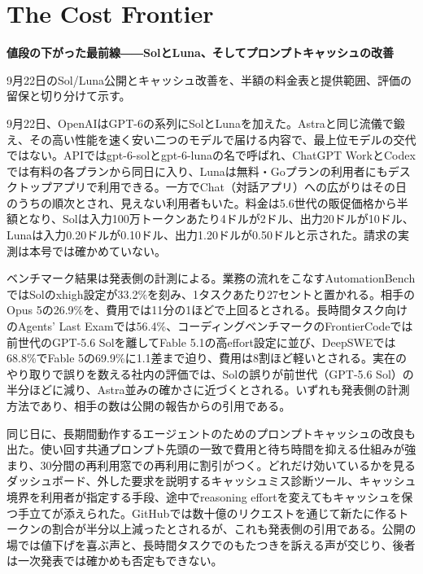 \section{The Cost Frontier}
\begin{wideflow}
{\Large\bfseries 値段の下がった最前線――SolとLuna、そしてプロンプトキャッシュの改善}\par
\smallskip
{\color{SurveyMuted}9月22日のSol/Luna公開とキャッシュ改善を、半額の料金表と提供範囲、評価の留保と切り分けて示す。}\par
\end{wideflow}

9月22日、OpenAIはGPT-6の系列にSolとLunaを加えた\cite{gpt6solluna}。Astraと同じ流儀で鍛え、その高い性能を速く安い二つのモデルで届ける内容で、最上位モデルの交代ではない。APIではgpt-6-solとgpt-6-lunaの名で呼ばれ、ChatGPT WorkとCodexでは有料の各プランから同日に入り、Lunaは無料・Goプランの利用者にもデスクトップアプリで利用できる。一方でChat（対話アプリ）への広がりはその日のうちの順次とされ、見えない利用者もいた。料金は5.6世代の販促価格から半額となり、Solは入力100万トークンあたり4ドルが2ドル、出力20ドルが10ドル、Lunaは入力0.20ドルが0.10ドル、出力1.20ドルが0.50ドルと示された。請求の実測は本号では確かめていない。

ベンチマーク結果は発表側の計測による。業務の流れをこなすAutomationBenchではSolのxhigh設定が33.2\%を刻み、1タスクあたり27セントと置かれる。相手のOpus 5の26.9\%を、費用では11分の1ほどで上回るとされる。長時間タスク向けのAgents' Last Examでは56.4\%、コーディングベンチマークのFrontierCodeでは前世代のGPT-5.6 Solを離してFable 5.1の高effort設定に並び、DeepSWEでは68.8\%でFable 5の69.9\%に1.1差まで迫り、費用は8割ほど軽いとされる。実在のやり取りで誤りを数える社内の評価では、Solの誤りが前世代（GPT-5.6 Sol）の半分ほどに減り、Astra並みの確かさに近づくとされる。いずれも発表側の計測方法であり、相手の数は公開の報告からの引用である。

同じ日に、長期間動作するエージェントのためのプロンプトキャッシュの改良も出た\cite{gpt6caching}。使い回す共通プロンプト先頭の一致で費用と待ち時間を抑える仕組みが強まり、30分間の再利用窓での再利用に割引がつく。どれだけ効いているかを見るダッシュボード、外した要求を説明するキャッシュミス診断ツール、キャッシュ境界を利用者が指定する手段、途中でreasoning effortを変えてもキャッシュを保つ手立てが添えられた。GitHubでは数十億のリクエストを通じて新たに作るトークンの割合が半分以上減ったとされるが、これも発表側の引用である。公開の場では値下げを喜ぶ声と、長時間タスクでのもたつきを訴える声が交じり、後者は一次発表では確かめも否定もできない。

